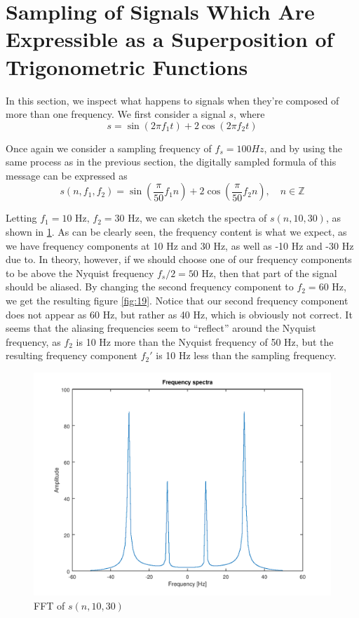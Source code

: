 \documentclass[a4paper, 12pt]{report}
\begin{document}
		\section{Sampling of Signals Which Are Expressible as a Superposition of Trigonometric Functions} %
		\label{sec:sampling_superposition_of_trigonometric_functions}
			In this section, we inspect what happens to signals when they're composed of more than one frequency. We first consider a signal $s$, where
			\[
				s = \sin(2\pi f_1t) + 2\cos(2\pi f_2 t)
			\]

			Once again we consider a sampling frequency of $f_s = 100 Hz$, and by using the same process as in the previous section, the digitally sampled formula of this message can be expressed as
			\[
				s(n, f_1, f_2) = \sin\left(\frac{\pi}{50} f_1 n\right) + 2\cos\left(\frac{\pi}{50} f_2 n\right), \quad n \in \mathbb{Z}
			\]

			Letting $f_1=10 \text{ Hz},\, f_2 = 30 \text{ Hz}$, we can sketch the spectra of $s(n, 10, 30)$, as shown in \ref{fig:18}. As can be clearly seen, the frequency content is what we expect, as we have frequency components at 10 Hz and 30 Hz, as well as -10 Hz and -30 Hz due to. In theory, however, if we should choose one of our frequency components to be above the Nyquist frequency $f_s/2 = 50$ Hz, then that part of the signal should be aliased. By changing the second frequency component to $f_2 = 60$ Hz, we get the resulting figure \ref{fig:19}. Notice that our second frequency component does not appear as 60 Hz, but rather as 40 Hz, which is obviously not correct. It seems that the aliasing frequencies seem to ``reflect'' around the Nyquist frequency, as $f_2$ is 10 Hz more than the Nyquist frequency of 50 Hz, but the resulting frequency component $f_2'$ is 10 Hz less than the sampling frequency.

			\begin{figure}[H]
				\includegraphics[width=\textwidth]{img/1_18.png}
				\caption{FFT of $s(n, 10, 30)$}
				\label{fig:18}
			\end{figure}
\end{document}
